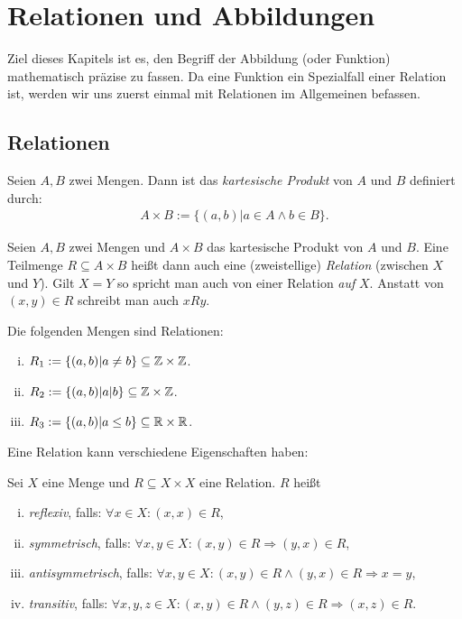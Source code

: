 \chapter{Relationen und Abbildungen}

Ziel dieses Kapitels ist es, den Begriff der Abbildung (oder Funktion)
mathematisch präzise zu fassen.
Da eine Funktion ein Spezialfall einer Relation ist, werden wir uns zuerst
einmal mit Relationen im Allgemeinen befassen.

\section{Relationen}

\begin{mydef}
Seien $A,B$ zwei Mengen. Dann ist das \textit{kartesische Produkt} von $A$ und $B$
definiert durch:
\begin{align*}
    A \times B := \{ (a,b) | a \in A \wedge b \in B \}.
\end{align*}
\end{mydef}

\begin{mydef}
Seien $A,B$ zwei Mengen und $A \times B$ das kartesische Produkt von $A$ und $B$.
Eine Teilmenge $R \subseteq A \times B$ heißt dann auch eine (zweistellige)
\textit{Relation} (zwischen $X$ und $Y$).
Gilt $X = Y$ so spricht man auch von einer Relation \textit{auf} $X$.
Anstatt von $(x,y) \in R$ schreibt man auch $xRy$.
\end{mydef}

\begin{example}
Die folgenden Mengen sind Relationen:
    \begin{enumerate}[(i)]
        \item
         $R_1 := \{(a,b) | a \neq b \} \subseteq \mathbb{Z} \times \mathbb{Z}$.
        \item
        $R_2 := \{ (a,b) | a | b \} \subseteq \mathbb{Z} \times \mathbb{Z}$.
        \item
        $R_3 := \{(a,b) | a \leq b\} \subseteq \mathbb{R} \times \mathbb{R}$.
    \end{enumerate}
\end{example}

Eine Relation kann verschiedene Eigenschaften haben:

\begin{mydef}
Sei $X$ eine Menge und $R \subseteq X \times X$ eine Relation. $R$ heißt
    \begin{enumerate}[(i)]
        \item
        \textit{reflexiv}, falls: $\forall x \in X: (x,x) \in R$,
        \item
        \textit{symmetrisch}, falls: $\forall x,y \in X : (x,y) \in R \Rightarrow (y,x) \in R$,
        \item
        \textit{antisymmetrisch}, falls: $\forall x,y \in X: (x,y) \in R \wedge (y,x) \in R \Rightarrow x=y$,
        \item
        \textit{transitiv}, falls: $\forall x,y,z \in X: (x,y) \in R \wedge (y,z) \in R \Rightarrow (x,z) \in R$.
    \end{enumerate}
\end{mydef}

